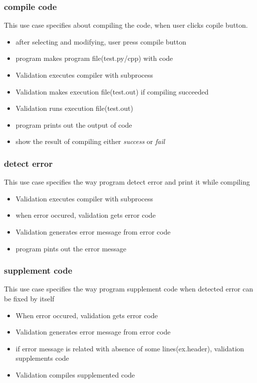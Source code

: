 \documentclass[conference]{IEEEtran}
\begin{document}
\subsubsection{compile code}
This use case specifies about compiling the code, when user clicks copile button.
\begin{itemize}
  \item after selecting and modifying, user press compile button
  \item program makes program file(test.py/cpp) with code
  \item Validation executes compiler with subprocess
  \item Validation makes execution file(test.out) if compiling succeeded
  \item Validation runs execution file(test.out)
  \item program prints out the output of code
  \item show the result of compiling either \textit{success} or \textit{fail}
\end{itemize}
\textit{}



\subsubsection{detect error}
This use case specifies the way program detect error and print it while compiling

\begin{itemize}
  \item Validation executes compiler with subprocess   
  \item when error occured, validation gets error code
  \item Validation generates error message from error code
  \item program pints out the error message
\end{itemize}
\textit{}



\subsubsection{supplement code}
This use case specifies the way program supplement code when detected error can be fixed by itself

\begin{itemize}
  \item When error occured, validation gets error code
  \item Validation generates error message from error code
  \item if error message is related with absence of some lines(ex.header), validation supplements code
  \item Validation compiles supplemented code
\end{itemize}
\textit{}
\end{document}
